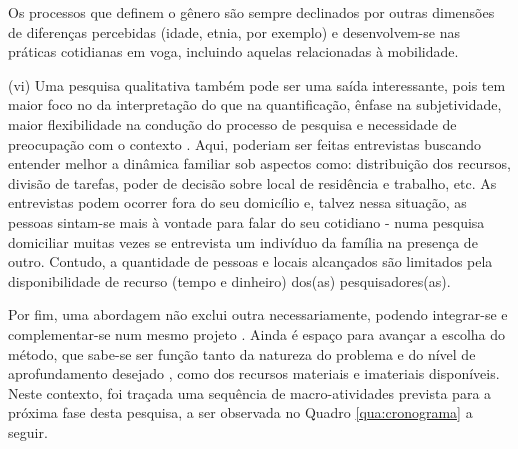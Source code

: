 \begin{citacao}
Os processos que definem o gênero são sempre declinados  por outras dimensões de diferenças percebidas (idade, etnia, por exemplo) e desenvolvem-se nas práticas cotidianas em voga, incluindo aquelas relacionadas à mobilidade.
\end{citacao}

(vi) Uma pesquisa qualitativa também pode ser uma saída interessante, pois tem maior foco no da interpretação do que na quantificação, ênfase na subjetividade, maior flexibilidade na condução do processo de pesquisa e necessidade de preocupação com o contexto \cite{CASELL1994}. Aqui, poderiam ser feitas entrevistas buscando entender melhor a dinâmica familiar sob aspectos como: distribuição dos recursos, divisão de tarefas, poder de decisão sobre local de residência e trabalho, etc. As entrevistas podem ocorrer fora do seu domicílio e, talvez nessa situação, as pessoas sintam-se mais à vontade para falar do seu cotidiano - numa pesquisa domiciliar muitas vezes se entrevista um indivíduo da família na presença de outro. Contudo, a quantidade de pessoas e locais alcançados são limitados pela disponibilidade de recurso (tempo e dinheiro) dos(as) pesquisadores(as). 

Por fim, uma abordagem não exclui outra necessariamente, podendo integrar-se e complementar-se num mesmo projeto \cite{MINAYO1996}. Ainda é espaço para avançar a escolha do método, que sabe-se ser função tanto da natureza do problema e do nível de aprofundamento desejado \cite{DIEHL2004}, como dos recursos materiais e imateriais disponíveis.
Neste contexto, foi traçada uma sequência de macro-atividades prevista para a próxima fase desta pesquisa, a ser observada no Quadro \ref{qua:cronograma} a seguir.

